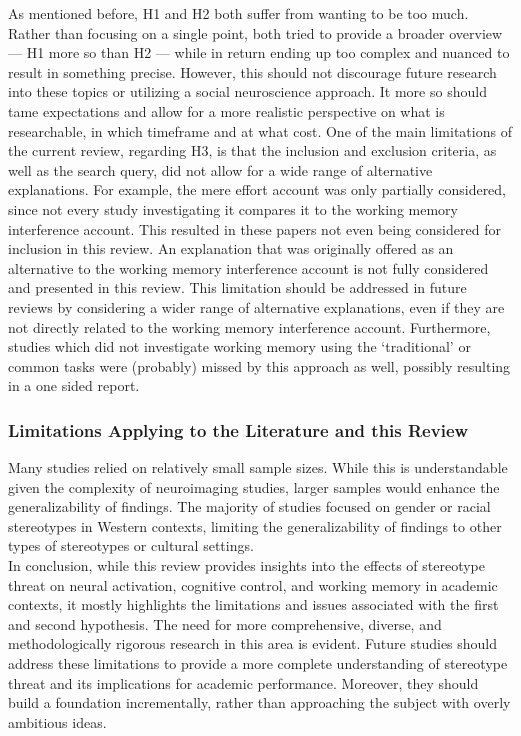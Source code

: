 \documentclass[
  stu, a4paper, 12pt,mask,floatsintext]{apa7}
\begin{document}
As mentioned before, H1 and H2 both suffer from wanting to be too much.
Rather than focusing on a single point, both tried to provide a broader overview --- H1 more so than H2 --- while in return ending up too complex and nuanced to result in something precise.
However, this should not discourage future research into these topics or utilizing a social neuroscience approach.
It more so should tame expectations and allow for a more realistic perspective on what is researchable, in which timeframe and at what cost.
One of the main limitations of the current review, regarding H3, is that the inclusion and exclusion criteria, as well as the search query, did not allow for a wide range of alternative explanations.
For example, the mere effort account was only partially considered, since not every study investigating it compares it to the working memory interference account.
This resulted in these papers not even being considered for inclusion in this review.
An explanation that was originally offered as an alternative to the working memory interference account is not fully considered and presented in this review.
This limitation should be addressed in future reviews by considering a wider range of alternative explanations, even if they are not directly related to the working memory interference account.
Furthermore, studies which did not investigate working memory using the `traditional' or common tasks were (probably) missed by this approach as well, possibly resulting in a one sided report.

\subsubsection{Limitations Applying to the Literature and this Review}\label{limitations-applying-to-the-literature-and-this-review}

Many studies relied on relatively small sample sizes.
While this is understandable given the complexity of neuroimaging studies, larger samples would enhance the generalizability of findings.
The majority of studies focused on gender or racial stereotypes in Western contexts, limiting the generalizability of findings to other types of stereotypes or cultural settings.\\
In conclusion, while this review provides insights into the effects of stereotype threat on neural activation, cognitive control, and working memory in academic contexts, it mostly highlights the limitations and issues associated with the first and second hypothesis.
The need for more comprehensive, diverse, and methodologically rigorous research in this area is evident.
Future studies should address these limitations to provide a more complete understanding of stereotype threat and its implications for academic performance.
Moreover, they should build a foundation incrementally, rather than approaching the subject with overly ambitious ideas.
\end{document}
